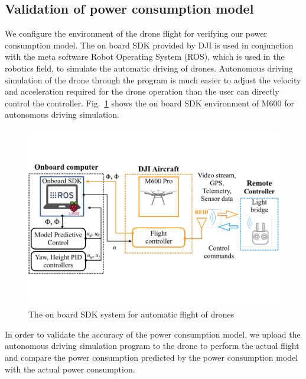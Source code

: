 \documentclass[journal]{./template/IEEEtran}
\begin{document}
\label{Section: Deep Neural networks (DNN)}





\subsection{Validation of power consumption model}

We configure the environment of the drone flight for verifying our power consumption model. 
The on board SDK provided by DJI is used in conjunction with the meta software Robot Operating System (ROS), which is used in the robotics field, to simulate the automatic driving of drones. 
Autonomous driving simulation of the drone through the program is much easier to adjust the velocity and acceleration required for the drone operation than the user can directly control the controller. 
Fig.~\ref{fig:SDK} shows the on board SDK environment of M600 for autonomous driving simulation.

\begin{figure}[htbp]
\centering\includegraphics[scale=0.285]{fig7/SDK.pdf}
\caption{The on board SDK system for automatic flight of drones}
\label{fig:SDK}
\end{figure}

In order to validate the accuracy of the power consumption model, we upload the autonomous driving simulation program to the drone to perform the actual flight and compare the power consumption predicted by the power consumption model with the actual power consumption. 
\end{document}
